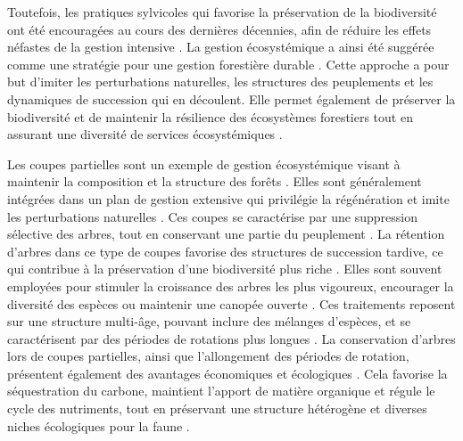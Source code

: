 Toutefois, les pratiques sylvicoles qui favorise la préservation de la biodiversité ont été encouragées au cours des dernières décennies, afin de réduire les effets néfastes de la gestion intensive \citep{Gustafsson2012Retentionforestry}. 
La gestion écosystémique a ainsi été suggérée comme une stratégie pour une gestion forestière durable \citep{Perry1998scientificbasis,Kuuluvainen2002Naturalvariabilitya}. 
Cette approche a pour but d'imiter les perturbations naturelles, les structures des peuplements et les dynamiques de succession qui en découlent. 
Elle permet également de préserver la biodiversité et de maintenir la résilience des écosystèmes forestiers tout en assurant une diversité de services écosystémiques \citep{Szaro1998emergenceecosystem,MacDicken2015Globalprogress}. 

Les coupes partielles sont un exemple de gestion écosystémique visant à maintenir la composition et la structure des forêts \citep{Bergeron1999Forestmanagementa}. 
Elles sont généralement intégrées dans un plan de gestion extensive qui privilégie la régénération et imite les perturbations naturelles \citep{Irland2011Timberproductivity}. 
Ces coupes se caractérise par une suppression sélective des arbres, tout en conservant une partie du peuplement \citep{Ameray2021Forestcarbon}. 
La rétention d'arbres dans ce type de coupes favorise des structures de succession tardive, ce qui contribue à la préservation d'une biodiversité plus riche \citep{Ameray2021Forestcarbon}. 
Elles sont souvent employées pour stimuler la croissance des arbres les plus vigoureux, encourager la diversité des espèces ou maintenir une canopée ouverte \citep{Irland2011Timberproductivity}. 
Ces traitements reposent sur une structure multi-âge, pouvant inclure des mélanges d'espèces, et se caractérisent par des périodes de rotations plus longues \citep{Kuuluvainen2009Forestmanagement}. 
La conservation d'arbres lors de coupes partielles, ainsi que l'allongement des périodes de rotation, présentent également des avantages économiques et écologiques \citep{Ameray2021Forestcarbon}. 
Cela favorise la séquestration du carbone, maintient l'apport de matière organique et régule le cycle des nutriments, tout en préservant une structure hétérogène et diverses niches écologiques pour la faune \citep{Dahlgren1994effectswholetree,Barg1999Influencepartial,Tong2020Forestmanagement,Ameray2021Forestcarbon}. 

